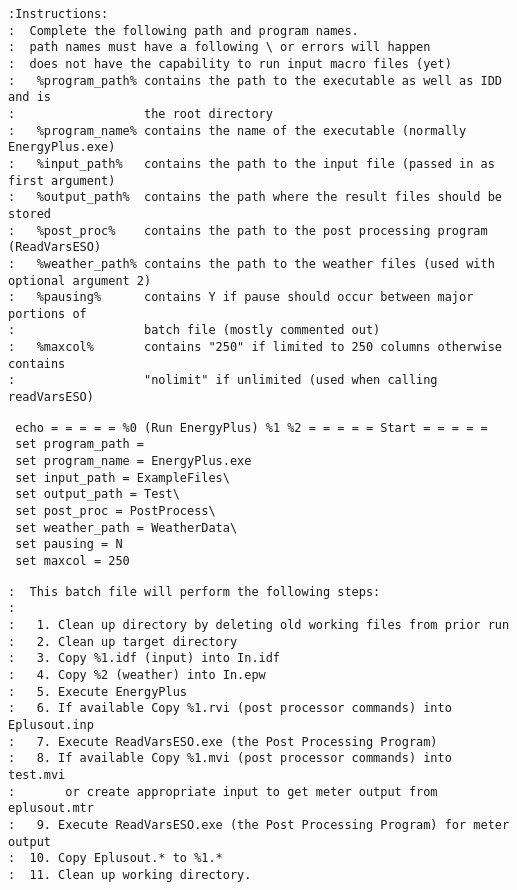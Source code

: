 \begin{lstlisting}
:Instructions:
:  Complete the following path and program names.
:  path names must have a following \ or errors will happen
:  does not have the capability to run input macro files (yet)
:   %program_path% contains the path to the executable as well as IDD and is
:                  the root directory
:   %program_name% contains the name of the executable (normally EnergyPlus.exe)
:   %input_path%   contains the path to the input file (passed in as first argument)
:   %output_path%  contains the path where the result files should be stored
:   %post_proc%    contains the path to the post processing program (ReadVarsESO)
:   %weather_path% contains the path to the weather files (used with optional argument 2)
:   %pausing%      contains Y if pause should occur between major portions of
:                  batch file (mostly commented out)
:   %maxcol%       contains "250" if limited to 250 columns otherwise contains
:                  "nolimit" if unlimited (used when calling readVarsESO)
\end{lstlisting}

\begin{lstlisting}
 echo = = = = = %0 (Run EnergyPlus) %1 %2 = = = = = Start = = = = =
 set program_path =
 set program_name = EnergyPlus.exe
 set input_path = ExampleFiles\
 set output_path = Test\
 set post_proc = PostProcess\
 set weather_path = WeatherData\
 set pausing = N
 set maxcol = 250
\end{lstlisting}

\begin{lstlisting}
:  This batch file will perform the following steps:
:
:   1. Clean up directory by deleting old working files from prior run
:   2. Clean up target directory
:   3. Copy %1.idf (input) into In.idf
:   4. Copy %2 (weather) into In.epw
:   5. Execute EnergyPlus
:   6. If available Copy %1.rvi (post processor commands) into Eplusout.inp
:   7. Execute ReadVarsESO.exe (the Post Processing Program)
:   8. If available Copy %1.mvi (post processor commands) into test.mvi
:       or create appropriate input to get meter output from eplusout.mtr
:   9. Execute ReadVarsESO.exe (the Post Processing Program) for meter output
:  10. Copy Eplusout.* to %1.*
:  11. Clean up working directory.
\end{lstlisting}
